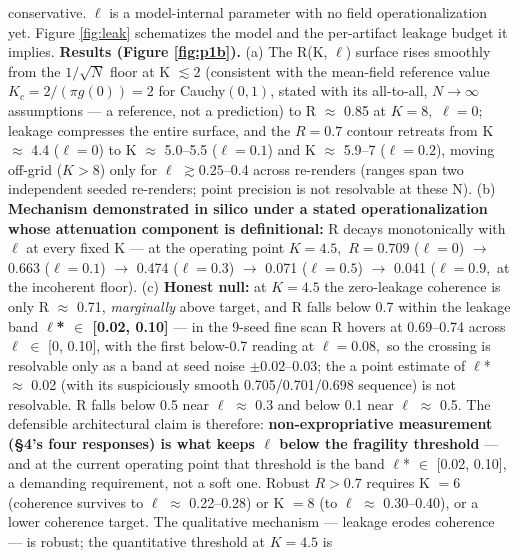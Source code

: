 \documentclass[11pt,twocolumn]{article}
\begin{document}
\begin{itemize}
  conservative. \(\ell\) is a model-internal parameter with no field
  operationalization yet. Figure \ref{fig:leak} schematizes the model and the
  per-artifact leakage budget it implies. \textbf{Results (Figure
  \ref{fig:p1b}).} (a) The R(K,
  \(\ell\)) surface rises smoothly from the \(1/\sqrt{N}\) floor at K
  \(\lesssim 2\) (consistent with the mean-field reference value
  \(K_c = 2/(\pi g(0)) = 2\) for Cauchy\((0,1)\), stated with its
  all-to-all, \(N \to \infty\) assumptions --- a reference, not a
  prediction) to R \(\approx\) 0.85 at \(K = 8,\) \(\ell = 0\); leakage
  compresses the entire surface, and the \(R = 0.7\) contour retreats
  from K \(\approx\) 4.4 (\(\ell = 0\)) to K \(\approx\)
  5.0--5.5 (\(\ell = 0.1\)) and K \(\approx\) 5.9--7
  (\(\ell = 0.2\)), moving off-grid
  (\(K > 8\)) only for \(\ell\) \(\gtrsim 0.25\)--0.4 across re-renders (ranges span two
  independent seeded re-renders; point precision is not resolvable at
  these N). (b) \textbf{Mechanism demonstrated in silico under a stated
  operationalization whose attenuation component is definitional:} R decays monotonically with \(\ell\) at every fixed K ---
  at the operating point \(K = 4.5,\) \(R = 0.709\) (\(\ell = 0\))
  \(\to\) 0.663 (\(\ell = 0.1\)) \(\to\) 0.474 (\(\ell = 0.3\)) \(\to\)
  0.071 (\(\ell = 0.5\)) \(\to\) 0.041 (\(\ell = 0.9,\) at the
  incoherent floor). (c) \textbf{Honest null:} at \(K = 4.5\) the
  zero-leakage coherence is only R \(\approx\) 0.71, \emph{marginally}
  above target, and R falls below 0.7 within the leakage band
  \textbf{\(\ell\)* \(\in\) {[}0.02, 0.10{]}} --- in the 9-seed fine
  scan R hovers at 0.69--0.74 across \(\ell\) \(\in\) {[}0, 0.10{]},
  with the first below-0.7 reading at \(\ell = 0.08,\) so the crossing
  is resolvable only as a band at seed noise \(\pm 0.02–0.03\); the
  a point estimate of \(\ell\)* \(\approx\) 0.02 (with its
  suspiciously smooth 0.705/0.701/0.698 sequence) is not resolvable. R
  falls below 0.5 near \(\ell\) \(\approx\) 0.3 and below 0.1 near
  \(\ell\) \(\approx\) 0.5. The defensible architectural claim is
  therefore: \textbf{non-expropriative measurement (§4's four responses)
  is what keeps \(\ell\) below the fragility threshold} --- and at the
  current operating point that threshold is the band \(\ell\)* \(\in\)
  {[}0.02, 0.10{]}, a demanding requirement, not a soft one. Robust
  \(R > 0.7\) requires K \(= 6\) (coherence survives to \(\ell\) \(\approx\) 0.22--0.28) or K \(= 8\)
  (to \(\ell\) \(\approx\) 0.30--0.40), or a lower
  coherence target. The qualitative mechanism --- leakage erodes
  coherence --- is robust; the quantitative threshold at \(K = 4.5\) is

\end{itemize}
\end{document}
